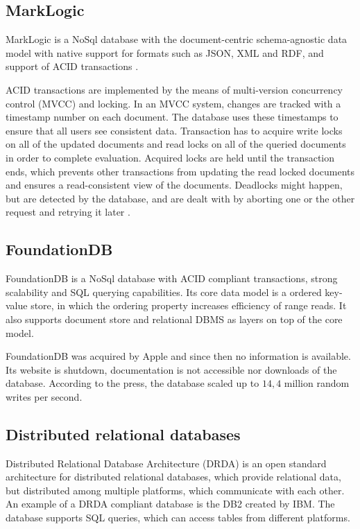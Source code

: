 \subsection{MarkLogic}
MarkLogic is a NoSql database with the document-centric schema-agnostic data model \cite{markLogicDataModel} with native support for formats such as JSON, XML and RDF, and support of ACID transactions \cite{markLogicAcid}.

ACID transactions are implemented by the means of multi-version concurrency control (MVCC) and locking. In an MVCC system, changes are tracked with a timestamp number on each document. 
The database uses these timestamps to ensure that all users see consistent data. 
Transaction has to acquire write locks on all of the updated documents and read locks on all of the queried documents in order to complete evaluation. Acquired locks are held until the transaction ends, which prevents other transactions from updating the read locked documents and ensures a read-consistent view of the documents. 
Deadlocks might happen, but are detected by the database, and are dealt with by aborting one or the other request and retrying it later \cite{markLogicUnderstandingTransactions}.


\subsection{FoundationDB}
FoundationDB is a NoSql database with ACID compliant transactions, strong scalability and SQL querying capabilities.
Its core data model is a ordered key-value store, in which the ordering property increases efficiency of range reads. It also supports document store and relational DBMS as layers on top of the core model. 

FoundationDB was acquired by Apple \cite{foundationDbAcquired} and since then no information is available. Its website is shutdown, documentation is not accessible nor downloads of the database. According to the press, the database scaled up to $14,4$ million random writes per second.


\subsection{Distributed relational databases}
Distributed Relational Database Architecture (DRDA) \cite{drda} is an open standard architecture for distributed relational databases, which provide relational data, but distributed among multiple platforms, which communicate with each other. An example of a DRDA compliant database is the DB2 created by IBM. The database supports SQL queries, which can access tables from different platforms. 

